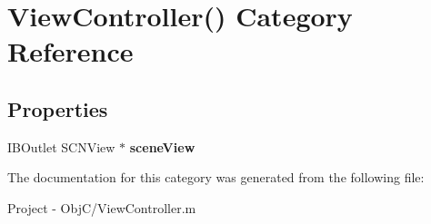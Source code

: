 \hypertarget{category_view_controller_07_08}{}\section{View\+Controller() Category Reference}
\label{category_view_controller_07_08}
\subsection*{Properties}
\begin{DoxyCompactItemize}
\item 
\hypertarget{category_view_controller_07_08_ab5d3d283fe8ffcc9d56b25b9be7e6d96}{}I\+B\+Outlet S\+C\+N\+View $\ast$ {\bfseries scene\+View}\label{category_view_controller_07_08_ab5d3d283fe8ffcc9d56b25b9be7e6d96}

\end{DoxyCompactItemize}


The documentation for this category was generated from the following file\+:\begin{DoxyCompactItemize}
\item 
Project -\/ Obj\+C/View\+Controller.\+m\end{DoxyCompactItemize}
